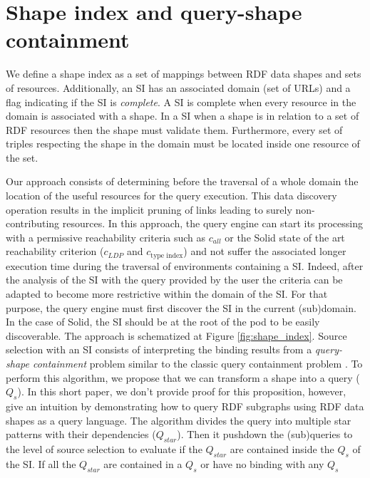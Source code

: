 \section{Shape index and query-shape containment}

We define a shape index as a set of mappings between RDF data shapes and sets of resources.
Additionally, an SI has an associated domain (set of URLs)
and a flag indicating if the SI is \emph{complete}.
A SI is complete when every resource in the domain is associated with a shape.
In a SI when a shape is in relation to a set of RDF resources then the shape must validate them.
Furthermore, every set of triples respecting the shape in the domain must be located inside one resource of the set.

Our approach consists of determining before the traversal of a whole domain the location of the useful resources for the query execution.
This data discovery operation results in the implicit pruning of links leading to surely non-contributing resources.
In this approach, the query engine can start its processing with a permissive reachability criteria
such as $c_{all}$ \cite{Hartig2012} or the Solid state of the art reachability criterion ($c_{LDP}$ and $c_{\text{type index}}$) \cite{Taelman2023}
and not suffer the associated longer execution time during the traversal of environments containing a SI.
Indeed, after the analysis of the SI with the query provided by the user the criteria can be adapted to become more restrictive within the domain of the SI.
For that purpose, the query engine must first discover the SI in the current (sub)domain.
In the case of Solid, the SI should be at the root of the pod to be easily discoverable.
The approach is schematized at Figure \ref{fig:shape_index}.
Source selection with an SI consists of interpreting the binding results from a \emph{query-shape containment} problem similar to the classic query containment problem \cite{afariQCE, Spasi2023}.
To perform this algorithm, we propose that we can transform a shape into a query ($Q_{s}$).
In this short paper, we don't provide proof for this proposition, however, 
\citeauthor{Delva2021} give an intuition by demonstrating how to query RDF subgraphs using RDF data shapes as a query language.
The algorithm divides the query into multiple star patterns with their dependencies ($Q_{star}$).
Then it pushdown \cite{Yang2021FlexPushdownDBHP} the (sub)queries to the level of source selection to evaluate if the $Q_{star}$ are contained inside the $Q_s$ of the SI.
If all the $Q_{star}$ are contained in a $Q_{s}$ or have no binding with any $Q_{s}$
